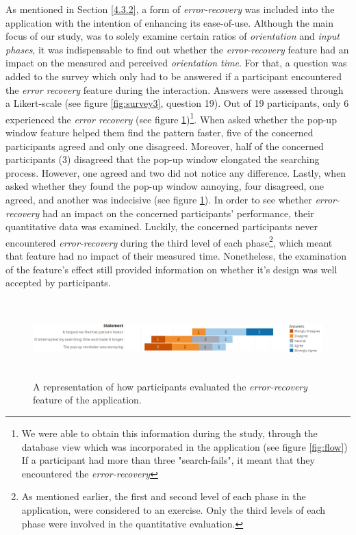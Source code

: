As mentioned in Section \ref{4.3.2}, a form of \textit{error-recovery} was included into the application with the intention of enhancing its ease-of-use. Although the main focus of our study, was to solely examine certain ratios of \textit{orientation} and \textit{input phases}, it was indispensable to find out whether the \textit{error-recovery} feature had an impact on the measured and perceived \textit{orientation time}. For that, a question was added to the survey which only had to be answered if a participant encountered the \textit{error recovery} feature during the interaction. Answers were assessed through a Likert-scale (see figure \ref{fig:survey3}, question 19). Out of 19 participants, only 6 experienced the \textit{error recovery} (see figure \ref{fig:error})\footnote{We were able to obtain this information during the study, through the database view which was incorporated in the application (see figure \ref{fig:flow}) If a participant had more than three "search-fails", it meant that they encountered the \textit{error-recovery}}. When asked whether the pop-up window feature helped them find the pattern faster, five of the concerned participants agreed and only one disagreed. Moreover, half of the concerned participants (3) disagreed that the pop-up window elongated the searching process. However, one agreed and two did not notice any difference. Lastly, when asked whether they found the pop-up window annoying, four disagreed, one agreed, and another was indecisive (see figure \ref{fig:error}). In order to see whether \textit{error-recovery} had an impact on the concerned participants' performance, their quantitative data was examined. Luckily, the concerned participants never encountered \textit{error-recovery} during the third level of each phase\footnote{As mentioned earlier, the first and second level of each phase in the application, were considered to an exercise. Only the third levels of each phase were involved in the quantitative evaluation.}, which meant that feature had no impact of their measured time. Nonetheless, the examination of the feature's effect still provided information on whether it's design was well accepted by participants. 

\begin{figure}[t!]
\centering
\includegraphics[width=15cm, height=3cm]{Chapters/graphics/ErrorRecovery.png}
\caption{A representation of how participants evaluated the \textit{error-recovery} feature of the application.}
\label{fig:error}
\end{figure}
